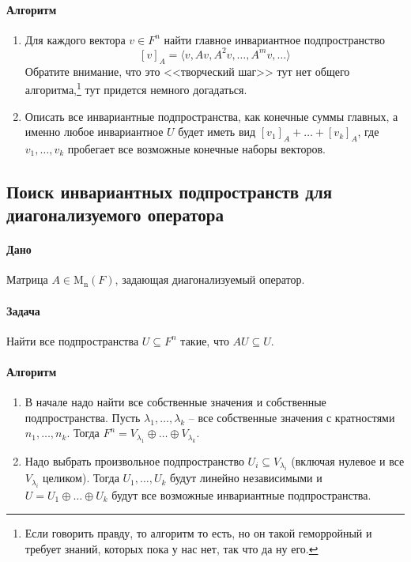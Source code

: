 \documentclass{article}
\newcommand{\Matrix}[2]{\operatorname{\mathrm{M}_{#2}}(#1)}
\begin{document}
\paragraph{Алгоритм}
\begin{enumerate}
\item Для каждого вектора $v\in F^n$ найти главное инвариантное подпространство
\[
[v]_A = \langle v, Av, A^2v, \ldots, A^mv, \ldots\rangle
\]
Обратите внимание, что это <<творческий шаг>> тут нет общего алгоритма,\footnote{Если говорить правду, то алгоритм то есть, но он такой геморройный и требует знаний, которых пока у нас нет, так что да ну его.} тут придется немного догадаться.

\item Описать все инвариантные подпространства, как конечные суммы главных, а именно любое инвариантное $U$ будет иметь вид $[v_1]_A + \ldots +[v_k]_A$, где $v_1,\ldots, v_k$ пробегает все возможные конечные наборы векторов.
\end{enumerate}

\subsection{Поиск инвариантных подпространств для диагонализуемого оператора}

\paragraph{Дано} Матрица $A\in\Matrix{F}{n}$, задающая диагонализуемый оператор.

\paragraph{Задача} Найти все подпространства $U\subseteq F^n$ такие, что $A U \subseteq U$.

\paragraph{Алгоритм}
\begin{enumerate}
\item В начале надо найти все собственные значения и собственные подпространства. Пусть $\lambda_1,\ldots, \lambda_k$ -- все собственные значения с кратностями $n_1,\ldots,n_k$. Тогда $F^n = V_{\lambda_1}\oplus \ldots \oplus V_{\lambda_k}$.

\item Надо выбрать произвольное подпространство $U_i\subseteq V_{\lambda_i}$ (включая нулевое и все $V_{\lambda_i}$ целиком). Тогда $U_1,\ldots, U_k$ будут линейно независимыми и $U = U_1 \oplus \ldots \oplus U_k$ будут все возможные инвариантные подпространства.
\end{enumerate}
\end{document}
